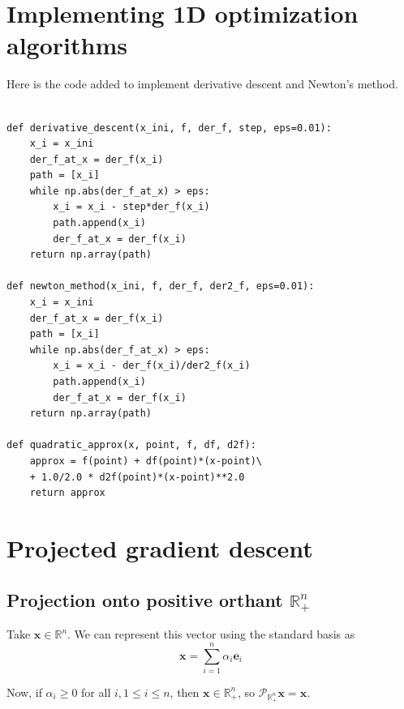\documentclass[paper=a4, fontsize=11pt]{scrartcl} %
\numberwithin{equation}{section} %
\numberwithin{figure}{section} %
\numberwithin{table}{section} %
\begin{document}

\section{Implementing 1D optimization algorithms}

Here is the code added to implement derivative descent and Newton's method.

\begin{lstlisting}[frame=single, basicstyle=\small]

def derivative_descent(x_ini, f, der_f, step, eps=0.01):
    x_i = x_ini
    der_f_at_x = der_f(x_i)
    path = [x_i]
    while np.abs(der_f_at_x) > eps:
        x_i = x_i - step*der_f(x_i)
        path.append(x_i)
        der_f_at_x = der_f(x_i)
    return np.array(path)

def newton_method(x_ini, f, der_f, der2_f, eps=0.01):
    x_i = x_ini
    der_f_at_x = der_f(x_i)
    path = [x_i]
    while np.abs(der_f_at_x) > eps:
        x_i = x_i - der_f(x_i)/der2_f(x_i)
        path.append(x_i)
        der_f_at_x = der_f(x_i)
    return np.array(path)
    
def quadratic_approx(x, point, f, df, d2f):
    approx = f(point) + df(point)*(x-point)\
    + 1.0/2.0 * d2f(point)*(x-point)**2.0
    return approx

\end{lstlisting}



\section{Projected gradient descent}

\subsection{Projection onto positive orthant $\mathbb{R}_+^n$}

Take $\bm{x} \in \mathbb{R}^n$. We can represent this vector using the standard basis as
\[\bm{x} = \sum_{i=1}^n \alpha_i \bm{e}_i\]

Now, if $\alpha_i \geq 0$ for all $i, 1 \leq i \leq n$, then $\bm{x} \in \mathbb{R}_+^n$, so $\mathcal{P}_{\mathbb{R}_+^n} \bm{x} = \bm{x}$. \\
\end{document}
